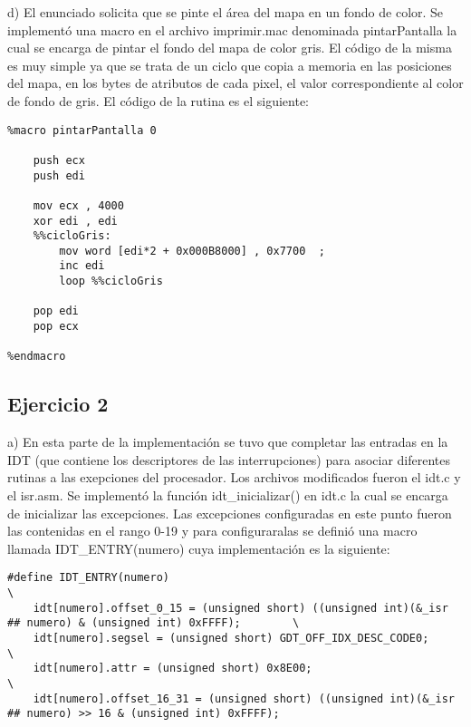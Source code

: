 \documentclass[a4paper]{article}
\begin{document}
d) El enunciado solicita que se pinte el área del mapa en un fondo de color. Se implementó una macro en el archivo imprimir.mac denominada pintarPantalla la cual se encarga de pintar el fondo del mapa de color gris. El código de la misma es muy simple ya que se trata de un ciclo que copia a memoria en las posiciones del mapa, en los bytes de atributos de cada pixel, el valor correspondiente al color de fondo de gris. El código de la rutina es el siguiente:

\begin{verbatim}
%macro pintarPantalla 0

    push ecx
    push edi

    mov ecx , 4000
    xor edi , edi
    %%cicloGris:
        mov word [edi*2 + 0x000B8000] , 0x7700  ;
        inc edi
        loop %%cicloGris

    pop edi
    pop ecx

%endmacro
\end{verbatim}

\subsection{Ejercicio 2}

a) En esta parte de la implementación se tuvo que completar las entradas en la IDT (que contiene los descriptores de las interrupciones) para asociar diferentes rutinas a las exepciones del procesador. Los archivos modificados fueron el idt.c y el isr.asm. Se implementó la función idt_inicializar() en idt.c la cual se encarga de inicializar las excepciones. Las excepciones configuradas en este punto fueron las contenidas en el rango 0-19 y para configuraralas se definió una macro llamada IDT_ENTRY(numero) cuya implementación es la siguiente:

\begin{verbatim}
#define IDT_ENTRY(numero)                                                                                        \
    idt[numero].offset_0_15 = (unsigned short) ((unsigned int)(&_isr ## numero) & (unsigned int) 0xFFFF);        \
    idt[numero].segsel = (unsigned short) GDT_OFF_IDX_DESC_CODE0;                                                                  \
    idt[numero].attr = (unsigned short) 0x8E00;                                                                  \
    idt[numero].offset_16_31 = (unsigned short) ((unsigned int)(&_isr ## numero) >> 16 & (unsigned int) 0xFFFF);
\end{verbatim}
\end{document}

